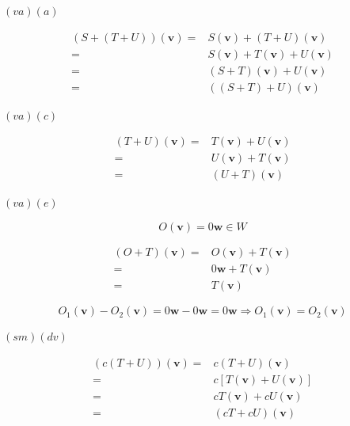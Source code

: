 \documentclass[
]{book}
\theoremstyle{definition}
\theoremstyle{definition}
\theoremstyle{definition}
\theoremstyle{definition}
\theoremstyle{remark}
\begin{document}
\(\left(va\right)\left(a\right)\)

\[
\begin{aligned}
\left(S+\left(T+U\right)\right)\left(\boldsymbol{v}\right)= & S\left(\boldsymbol{v}\right)+\left(T+U\right)\left(\boldsymbol{v}\right)\\
= & S\left(\boldsymbol{v}\right)+T\left(\boldsymbol{v}\right)+U\left(\boldsymbol{v}\right)\\
= & \left(S+T\right)\left(\boldsymbol{v}\right)+U\left(\boldsymbol{v}\right)\\
= & \left(\left(S+T\right)+U\right)\left(\boldsymbol{v}\right)
\end{aligned}
\]

\(\left(va\right)\left(c\right)\)

\[
\begin{aligned}
\left(T+U\right)\left(\boldsymbol{v}\right)= & T\left(\boldsymbol{v}\right)+U\left(\boldsymbol{v}\right)\\
= & U\left(\boldsymbol{v}\right)+T\left(\boldsymbol{v}\right)\\
= & \left(U+T\right)\left(\boldsymbol{v}\right)
\end{aligned}
\]

\(\left(va\right)\left(e\right)\)

\[
O\left(\boldsymbol{v}\right)=0\boldsymbol{w}\in W
\]

\[
\begin{aligned}
\left(O+T\right)\left(\boldsymbol{v}\right)= & O\left(\boldsymbol{v}\right)+T\left(\boldsymbol{v}\right)\\
= & 0\boldsymbol{w}+T\left(\boldsymbol{v}\right)\\
= & T\left(\boldsymbol{v}\right)
\end{aligned}
\]

\[
O_{1}\left(\boldsymbol{v}\right)-O_{2}\left(\boldsymbol{v}\right)=0\boldsymbol{w}-0\boldsymbol{w}=0\boldsymbol{w}\Rightarrow O_{1}\left(\boldsymbol{v}\right)=O_{2}\left(\boldsymbol{v}\right)
\]

\(\left(sm\right)\left(dv\right)\)

\[
\begin{aligned}
\left(c\left(T+U\right)\right)\left(\boldsymbol{v}\right)= & c\left(T+U\right)\left(\boldsymbol{v}\right)\\
= & c\left[T\left(\boldsymbol{v}\right)+U\left(\boldsymbol{v}\right)\right]\\
= & cT\left(\boldsymbol{v}\right)+cU\left(\boldsymbol{v}\right)\\
= & \left(cT+cU\right)\left(\boldsymbol{v}\right)
\end{aligned}
\]
\end{document}
